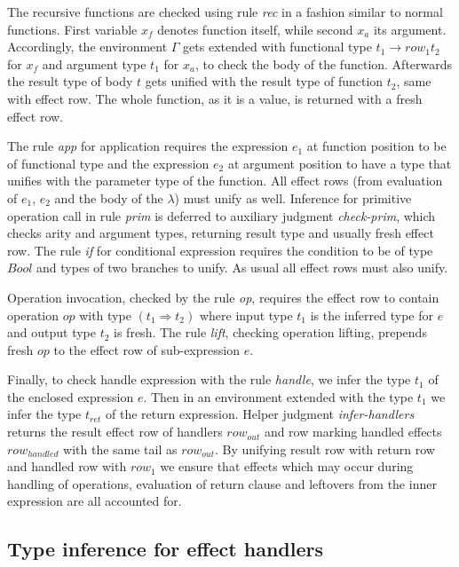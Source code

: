 \documentclass[inz, english, longabstract]{iithesis}
\begin{document}
The recursive functions are checked using rule \emph{rec} in a fashion similar to normal functions.
First variable $x_f$ denotes function itself, while second $x_a$ its argument.
Accordingly, the environment $\Gamma$ gets extended with functional type $ t_1 \rightarrow row_1 t_2 $ for $x_f$ and argument type $ t_1 $ for $x_a$, to check the body of the function.
Afterwards the result type of body $ t $ gets unified with the result type of function $ t_2 $, same with effect row.
The whole function, as it is a value, is returned with a fresh effect row.

The rule \emph{app} for application requires the expression $e_1$ at function position to be of functional type and the expression $e_2$ at argument position to have a type that unifies with the parameter type of the function. 
All effect rows (from evaluation of $e_1$, $e_2$ and the body of the $\lambda$) must unify as well.
Inference for primitive operation call in rule \emph{prim} is deferred to auxiliary judgment \emph{check-prim}, which checks arity and argument types, returning result type and usually fresh effect row.
The rule \emph{if} for conditional expression requires the condition to be of type $ Bool $ and types of two branches to unify.
As usual all effect rows must also unify.

Operation invocation, checked by the rule \emph{op}, requires the effect row to contain operation $ op $ with type $ (t_1 \Rightarrow t_2) $ where input type $ t_1 $ is the inferred type for $ e $ and output type $ t_2 $ is fresh.
The rule \emph{lift}, checking operation lifting, prepends fresh $ op $ to the effect row of sub-expression $e$.

Finally, to check handle expression with the rule \emph{handle}, we infer the type $t_1$ of the enclosed expression $e$.
Then in an environment extended with the type $t_1$ we infer the type $t_{ret}$ of the return expression.
Helper judgment \textit{infer-handlers} returns the result effect row of handlers $row_{out}$ and row marking handled effects $ row_{handled} $ with the same tail as $row_{out}$.
By unifying result row with return row and handled row with $row_1$ we ensure that effects which may occur during handling of operations, evaluation of return clause and leftovers from the inner expression are all accounted for.

\subsection{Type inference for effect handlers}
\end{document}
